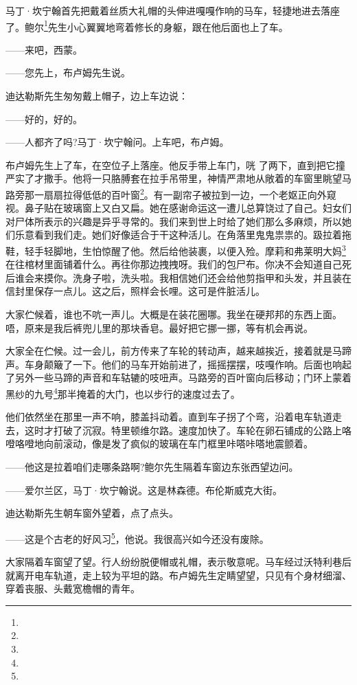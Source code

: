 \par 马丁·坎宁翰首先把戴着丝质大礼帽的头伸进嘎嘎作响的马车，轻捷地进去落座了。鲍尔\footnote{}先生小心翼翼地弯着修长的身躯，跟在他后面也上了车。
\par ——来吧，西蒙。
\par ——您先上，布卢姆先生说。
\par 迪达勒斯先生匆匆戴上帽子，边上车边说：
\par ——好的，好的。
\par ——人都齐了吗?马丁·坎宁翰问。上车吧，布卢姆。
\par 布卢姆先生上了车，在空位子上落座。他反手带上车门，咣 了两下，直到把它撞严实了才撒手。他将一只胳膊套在拉手吊带里，神情严肃地从敞着的车窗里眺望马路旁那一扇扇拉得低低的百叶窗\footnote{}。有一副帘子被拉到一边，一个老妪正向外窥视。鼻子贴在玻璃窗上又白又扁。她在感谢命运这一遭儿总算饶过了自己。妇女们对尸体所表示的兴趣是异乎寻常的。我们来到世上时给了她们那么多麻烦，所以她们乐意看到我们走。她们好像适合于干这种活儿。在角落里鬼鬼祟祟的。趿拉着拖鞋，轻手轻脚地，生怕惊醒了他。然后给他装裹，以便入殓。摩莉和弗莱明大妈\footnote{}在往棺材里面铺着什么。再往你那边拽拽呀。我们的包尸布。你决不会知道自己死后谁会来摸你。洗身子啦，洗头啦。我相信她们还会给他剪指甲和头发，并且装在信封里保存一点儿。这之后，照样会长哩。这可是件脏活儿。
\par 大家伫候着，谁也不吭一声儿。大概是在装花圈哪。我坐在硬邦邦的东西上面。唔，原来是我后裤兜儿里的那块香皂。最好把它挪一挪，等有机会再说。
\par 大家全在伫候。过一会儿，前方传来了车轮的转动声，越来越挨近，接着就是马蹄声。车身颠簸了一下。他们的马车开始前进了，摇摇摆摆，吱嘎作响。后面也响起了另外一些马蹄的声音和车轱辘的吱吜声。马路旁的百叶窗向后移动；门环上蒙着黑纱的九号\footnote{}那半掩着的大门，也以步行的速度过去了。
\par 他们依然坐在那里一声不响，膝盖抖动着。直到车子拐了个弯，沿着电车轨道走去，这时才打破了沉寂。特里顿维尔路。速度加快了。车轮在卵石铺成的公路上咯噔咯噔地向前滚动，像是发了疯似的玻璃在车门框里咔嗒咔嗒地震颤着。
\par ——他这是拉着咱们走哪条路啊?鲍尔先生隔着车窗边东张西望边问。
\par ——爱尔兰区，马丁·坎宁翰说。这是林森德。布伦斯威克大街。
\par 迪达勒斯先生朝车窗外望着，点了点头。
\par ——这是个古老的好风习\footnote{}，他说。我很高兴如今还没有废除。
\par 大家隔着车窗望了望。行人纷纷脱便帽或礼帽，表示敬意呢。马车经过沃特利巷后就离开电车轨道，走上较为平坦的路。布卢姆先生定睛望望，只见有个身材细溜、穿着丧服、头戴宽檐帽的青年。
